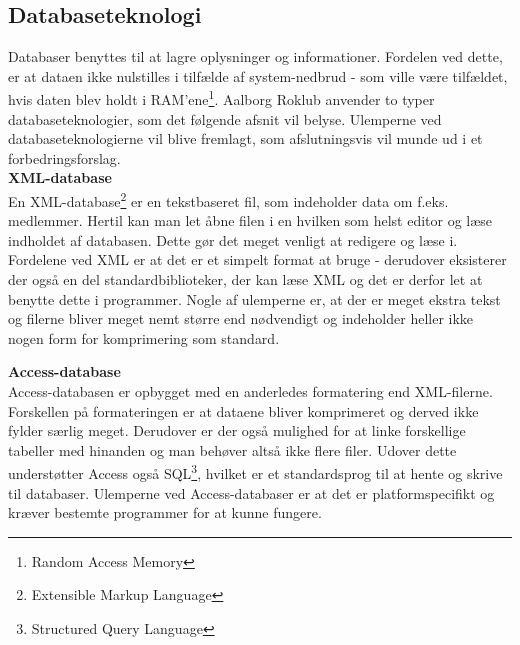 \subsection{Databaseteknologi}


\label{sec:Databaseteknologi}
Databaser benyttes til at lagre oplysninger og informationer. Fordelen ved dette, er at dataen ikke nulstilles i tilfælde af system-nedbrud - som ville være tilfældet, hvis daten blev holdt i RAM'ene\footnote{Random Access Memory}. Aalborg Roklub anvender to typer databaseteknologier, som det følgende afsnit vil belyse. Ulemperne ved databaseteknologierne vil blive fremlagt, som afslutningsvis vil munde ud i et forbedringsforslag. \\

{\bf{XML-database}}\\
En XML-database\footnote{Extensible Markup Language} er en tekstbaseret fil, som indeholder data om f.eks. medlemmer. Hertil kan man let åbne filen i en hvilken som helst editor og læse indholdet af databasen. Dette gør det meget venligt at redigere og læse i.\\

Fordelene ved XML er at det er et simpelt format at bruge - derudover eksisterer der også en del standardbiblioteker, der kan læse XML og det er derfor let at benytte dette i programmer. Nogle af ulemperne er, at der er meget ekstra tekst og filerne bliver meget nemt større end nødvendigt og indeholder heller ikke nogen form for komprimering som standard.


{\bf{Access-database}}\\
Access-databasen er opbygget med en anderledes formatering end XML-filerne. Forskellen på formateringen er at dataene bliver komprimeret og derved ikke fylder særlig meget. Derudover er der også mulighed for at linke forskellige tabeller med hinanden og man behøver altså ikke flere filer. Udover dette understøtter Access også SQL\footnote{Structured Query Language}, hvilket er et standardsprog til at hente og skrive til databaser. Ulemperne ved Access-databaser er at det er platformspecifikt og kræver bestemte programmer for at kunne fungere.\\

